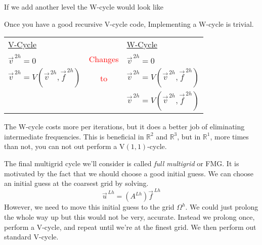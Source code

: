 If we add another level the W-cycle would look like

\begin{center}

\end{center}


Once you have a good recursive V-cycle code, Implementing a W-cycle is trivial.


\begin{center}
\begin{tabular}[t]{lcl}
  \underline{V-Cycle} & & \underline{W-Cycle} \\
  $\vec{v}^{\,2h} = 0$ &\textcolor{red}{Changes} & $\vec{v}^{\,2h} = 0$\\
  $\vec{v}^{\,2h} = V(\vec{v}^{\,2h}, \vec{f}^{\,2h})$ &\textcolor{red}{to}&$\vec{v}^{\,2h} = V(\vec{v}^{\,2h}, \vec{f}^{\,2h})$\\
  &&$\vec{v}^{\,2h} = V(\vec{v}^{\,2h}, \vec{f}^{\,2h})$
\end{tabular}
\end{center}

The W-cycle costs more per iterations, but it does a better job of eliminating
intermediate frequencies. This is beneficial in $\mathbb{R}^2$ and
$\mathbb{R}^3$, but in  $\mathbb{R}^1$, more times than not, you can not out
perform a V$(1, 1)$-cycle.

The final multigrid cycle we'll consider is called \emph{full multigrid} or FMG. It is
motivated by the fact that we should choose a good initial guess. We can choose
an initial guess at the coarsest grid by solving.
\begin{equation*}
\vec{u}^{\,Lh} = (A^{Lh}) \vec{f}^{\,Lh} 
\end{equation*}
However, we need to move this initial guess to the grid $\Omega^h$. We could
just prolong the whole way up but this would not be very, accurate. Instead we
prolong once, perform a V-cycle, and repeat until we're at the finest grid. We
then perform out standard V-cycle.

